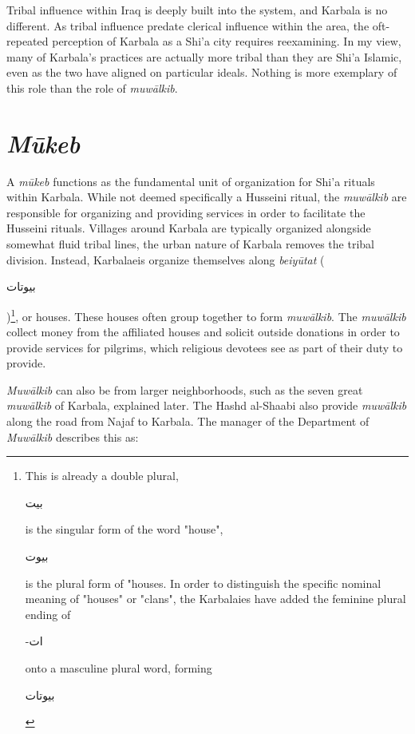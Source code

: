 Tribal influence within Iraq is deeply built into the system, and Karbala is no different. As tribal influence predate clerical influence within the area, the oft-repeated perception of Karbala as a Shi'a city requires reexamining. In my view, many of Karbala's practices are actually more tribal than they are Shi'a Islamic, even as the two have aligned on particular ideals. Nothing is more exemplary of this role than the role of \emph{muwālkib}. 

\section{\emph{Mūkeb}}
A \emph{mūkeb} functions as the fundamental unit of organization for Shi’a rituals within Karbala. While not deemed specifically a Husseini ritual, the \emph{muwālkib} are responsible for organizing and providing services in order to facilitate the Husseini rituals. Villages around Karbala are typically organized alongside somewhat fluid tribal lines, the urban nature of Karbala removes the tribal division. Instead, Karbalaeis organize themselves along \emph{beiyūtat} (\begin{Arabic}بيوتات\end{Arabic})\footnote{This is already a double plural, \begin{Arabic}بيت\end{Arabic} is the singular form of the word "house", \begin{Arabic}
    بيوت
\end{Arabic} is the plural form of "houses. In order to distinguish the specific nominal meaning of "houses" or "clans", the Karbalaies have added the feminine plural ending of \begin{Arabic}
    -ات
\end{Arabic} onto a masculine plural word, forming \begin{Arabic}
    بيوتات
\end{Arabic}}, or houses. These houses often group together to form \emph{muwālkib}. The \emph{muwālkib} collect money from the affiliated houses and solicit outside donations in order to provide services for pilgrims, which religious devotees see as part of their duty to provide. 

\emph{Muwālkib} can also be from larger neighborhoods, such as the seven great \emph{muwālkib} of Karbala, explained later. The Hashd al-Shaabi also provide \emph{muwālkib} along the road from Najaf to Karbala. The manager of the Department of \emph{Muwālkib} describes this as:

